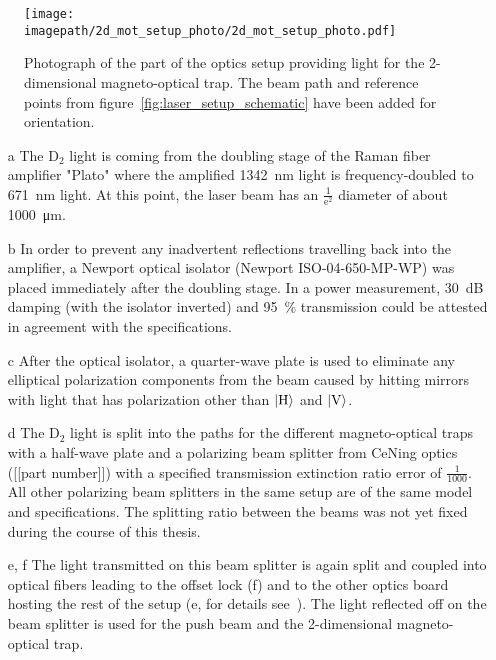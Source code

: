 \begin{figure}
    \centering
    \texttt{[image: \\imagepath/2d\_mot\_setup\_photo/2d\_mot\_setup\_photo.pdf]}
    \caption{Photograph of the part of the optics setup providing light for the 2-dimensional magneto-optical trap. The beam path and reference points from figure~\ref{fig:laser_setup_schematic} have been added for orientation.}\label{fig:2d_mot_setup_photo}
\end{figure}

\begin{itemize}
    \item[a] The D$_2$ light is coming from the doubling stage of the Raman fiber amplifier "Plato" where the amplified \SI{1342}{\nano\meter} light is frequency-doubled to \SI{671}{\nano\meter} light. At this point, the laser beam has an $\frac{1}{\text{e}^2}$ diameter of about \SI{1000}{\micro\meter}.

    \item[b] In order to prevent any inadvertent reflections travelling back into the amplifier, a Newport optical isolator (Newport ISO-04-650-MP-WP) was placed immediately after the doubling stage. In a power measurement, \SI{30}{\deci\bel} damping (with the isolator inverted) and \SI{95}{\percent} transmission could be attested in agreement with the specifications.

    \item[c] After the optical isolator, a quarter-wave plate is used to eliminate any elliptical polarization components from the beam caused by hitting mirrors with light that has polarization other than $\Ket{\text{H}}$ and $\Ket{\text{V}}$.

    \item[d] The D$_2$ light is split into the paths for the different magneto-optical traps with a half-wave plate and a polarizing beam splitter from CeNing optics ([[part number]]) with a specified transmission extinction ratio error of $\frac{1}{1000}$. All other polarizing beam splitters in the same setup are of the same model and specifications. The splitting ratio between the beams was not yet fixed during the course of this thesis.

    \item[e, f] The light transmitted on this beam splitter is again split and coupled into optical fibers leading to the offset lock (f) and to the other optics board hosting the rest of the setup (e, for details see~\cite{qesja_design_2022}). The light reflected off on the beam splitter is used for the push beam and the 2-dimensional magneto-optical trap.


\end{itemize}
